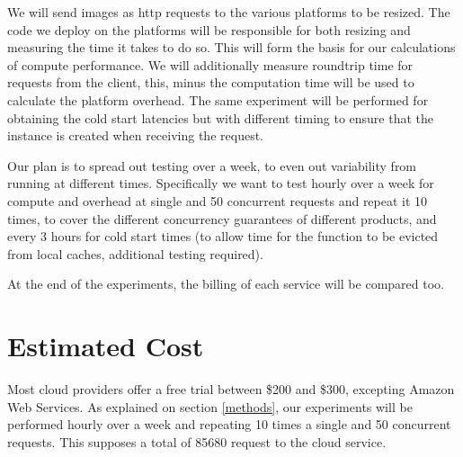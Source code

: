 \documentclass[11pt]{article}
\begin{document}
We will send images as http requests to the various platforms to be resized. The code we deploy on the platforms will be responsible for both resizing and measuring the time it takes to do so. This will form the basis for our calculations of compute performance. We will additionally measure roundtrip time for requests from the client, this, minus the computation time will be used to calculate the platform overhead.  The same experiment will be performed for obtaining the cold start latencies but with different timing to ensure that the instance is created when receiving the request. 

Our plan is to spread out testing over a week, to even out variability from running at different times. Specifically we want to test hourly over a week for compute and overhead at single and 50 concurrent requests and repeat it 10 times, to cover the different concurrency guarantees of different products, and every 3 hours for cold start times (to allow time for the function to be evicted from local caches, additional testing required).

At the end of the experiments, the billing of each service will be compared too.


\section{Estimated Cost}
Most cloud providers offer a free trial between \$200 and \$300, excepting Amazon Web Services. As explained on section \ref{methods}, our experiments will be performed hourly over a week and repeating 10 times a single and 50 concurrent requests. This supposes a total of 85680 request to the cloud service. 
\end{document}
